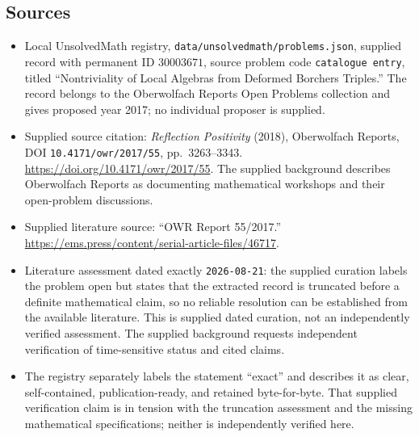 \documentclass[11pt]{article}
\begin{document}
\subsection{Sources}
\begin{itemize}
\item Local UnsolvedMath registry, \texttt{data/unsolvedmath/problems.json}, supplied record with permanent ID \(30003671\), source problem code \texttt{catalogue entry}, titled ``Nontriviality of Local Algebras from Deformed Borchers Triples.'' The record belongs to the Oberwolfach Reports Open Problems collection and gives proposed year 2017; no individual proposer is supplied.
\item Supplied source citation: \emph{Reflection Positivity} (2018), Oberwolfach Reports, DOI \texttt{10.4171/owr/2017/55}, pp.\ 3263--3343. \url{https://doi.org/10.4171/owr/2017/55}. The supplied background describes Oberwolfach Reports as documenting mathematical workshops and their open-problem discussions.
\item Supplied literature source: ``OWR Report 55/2017.'' \url{https://ems.press/content/serial-article-files/46717}.
\item Literature assessment dated exactly \texttt{2026-08-21}: the supplied curation labels the problem open but states that the extracted record is truncated before a definite mathematical claim, so no reliable resolution can be established from the available literature. This is supplied dated curation, not an independently verified assessment. The supplied background requests independent verification of time-sensitive status and cited claims.
\item The registry separately labels the statement ``exact'' and describes it as clear, self-contained, publication-ready, and retained byte-for-byte. That supplied verification claim is in tension with the truncation assessment and the missing mathematical specifications; neither is independently verified here.
\end{itemize}
\end{document}
